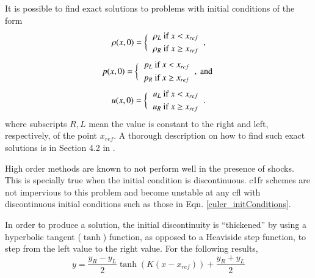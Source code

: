 It is possible to find exact solutions to problems with initial conditions of the form
\begin{equation*}
\rho(x,0) = \bigg\{
\begin{tabular}{c}
$
\begin{aligned}
\rho_L &\text{ if } x < x_{ref}\\
\rho_R &\text{ if } x \ge x_{ref}
\end{aligned}
$
\end{tabular},
\end{equation*}
\begin{equation}
\label{euler_initConditions}
p(x,0) = \bigg\{
\begin{tabular}{c}
$
\begin{aligned}
p_L &\text{ if } x < x_{ref}\\
p_R &\text{ if } x \ge x_{ref}
\end{aligned}
$
\end{tabular}, \text{ and }
\end{equation}
\begin{equation*}
 u(x,0) =\bigg\{
\begin{tabular}{c}
$
\begin{aligned}
u_L &\text{ if } x < x_{ref}\\
u_R &\text{ if } x \ge x_{ref}
\end{aligned}
$
\end{tabular}.
\end{equation*}
where subscripts $R,L$ mean the value is constant to the right and left, respectively, of the point $x_{ref}$. A thorough description on how to find such exact solutions is in Section 4.2 in \cite{solvers1997numerical}.

High order methods are known to not perform well in the presence of shocks. This is specially true when the initial condition is discontinuous. \gls{c1fr} schemes are not impervious to this problem and become unstable at any \gls{cfl} with discontinuous initial conditions such as those in Eqn. \eqref{euler_initConditions}.

In order to produce a solution, the initial discontinuity is ``thickened'' by using a hyperbolic tangent ($\tanh$) function, as opposed to a Heaviside step function, to step from the left value to the right value. For the following results, 
\begin{equation}
y = \frac{y_R - y_L}{2} \tanh(K (x - x_{ref})) + \frac{y_R + y_L}{2}
\end{equation}

